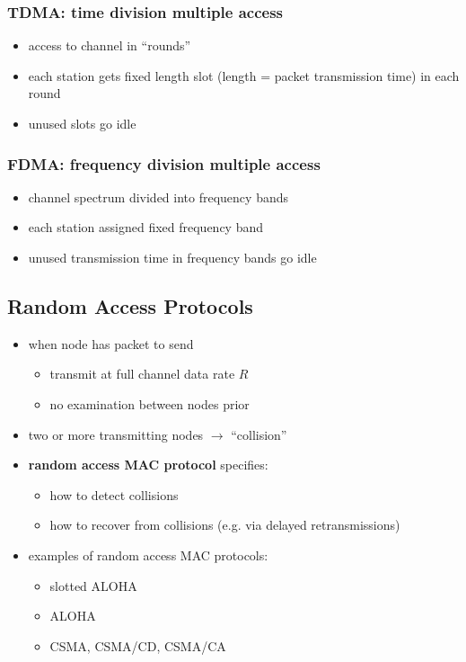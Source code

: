 \subsubsection{TDMA: time division multiple access}\label{sec:tdma}
\begin{itemize}
	\item access to channel in ``rounds''
	\item each station gets fixed length slot (length = packet transmission time) in each round
	\item unused slots go idle
\end{itemize}
\subsubsection{FDMA: frequency division multiple access}\label{sec:fdma}
\begin{itemize}
	\item channel spectrum divided into frequency bands
	\item each station assigned fixed frequency band
	\item unused transmission time in frequency bands go idle
\end{itemize}

\subsection{Random Access Protocols}
\begin{itemize}
	\item when node has packet to send
	\begin{itemize}
		\item transmit at full channel data rate $R$
		\item no examination between nodes prior
	\end{itemize}
	\item two or more transmitting nodes $\rightarrow$ ``collision''
	\item \textbf{random access MAC protocol} specifies:
	\begin{itemize}
		\item how to detect collisions
		\item how to recover from collisions (e.g. via delayed retransmissions)
	\end{itemize}
	\item examples of random access MAC protocols:
	\begin{itemize}
		\item slotted ALOHA
		\item ALOHA
		\item CSMA, CSMA/CD, CSMA/CA
	\end{itemize}
\end{itemize}
